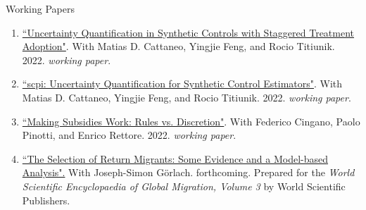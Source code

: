 \documentclass{resume} %
\begin{document}


\begin{rSection}{Working Papers} 

\begin{enumerate}

\item \href{https://filippopalomba.github.io/docs/Cattaneo-Feng-Palomba-Titiunik_2022_SAMT.pdf}{``Uncertainty Quantification in Synthetic Controls with Staggered Treatment Adoption"}. With Matias D. Cattaneo, Yingjie Feng, and Rocio Titiunik. 2022. \textit{working paper}.

\item \href{https://filippopalomba.github.io/docs/Cattaneo-Feng-Palomba-Titiunik_2022_scpi.pdf}{``scpi: Uncertainty Quantification for Synthetic Control Estimators"}. With Matias D. Cattaneo, Yingjie Feng, and Rocio Titiunik. 2022. \textit{working paper}.

\item \href{https://filippopalomba.github.io/docs/Cingano-Palomba-Pinotti-Rettore_2022_subsidies.pdf}{``Making Subsidies Work: Rules vs. Discretion"}. With Federico Cingano, Paolo Pinotti, and Enrico Rettore. 2022. \textit{working paper}.

\item \href{https://filippopalomba.github.io/docs/Goerlach-Palomba_2023.pdf}{``The Selection of Return Migrants: Some Evidence and a Model-based Analysis".} With Joseph-Simon G{\"o}rlach. forthcoming. Prepared for the \textit{World Scientific Encyclopaedia of Global Migration, Volume 3} by World Scientific Publishers.
\end{enumerate}

\end{rSection}
\end{document}

